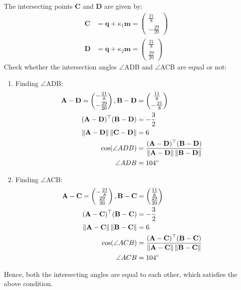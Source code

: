 \documentclass[12pt]{article}
\providecommand{\norm}[1]{\left\lVert#1\right\rVert}
\newcommand{\myvec}[1]{\ensuremath{\begin{pmatrix}#1\end{pmatrix}}}
\let\vec\mathbf
\let\vec\mathbf
\providecommand{\norm}[1]{\left\lVert#1\right\rVert}
\let\vec\mathbf
\begin{document}
The intersecting points $\vec{C}$ and $\vec{D}$ are given by:
\begin{align}
    \vec{C}&=\vec{q}+\kappa_1\vec{m}=\myvec{\frac{21}{8}\\[2pt]-\frac{29}{20}}\\
    \vec{D}&=\vec{q}+\kappa_2\vec{m}=\myvec{\frac{21}{8}\\[2pt]\frac{29}{20}}
\end{align}
Check whether the intersection angles $\angle$ADB and $\angle$ACB are equal or not:
\begin{enumerate}
\item Finding $\angle$ADB:
	\begin{align}
		 \vec{A-D} = \myvec{-\frac{21}{8}\\[2pt]-\frac{29}{20}},
		\vec{B-D}& = \myvec{\frac{11}{8}\\[2pt]-\frac{21}{8}}\\
	 \vec{(A-D)^\top(B-D)}&= -\frac{3}{2}\\
	 \norm{\vec{A-D}}\norm{\vec{C-D}}& = 6\\
		\cos(\angle ADB)& = \frac{\vec{(A-D)^\top(B-D)}}{\norm{\vec{A-D}}\norm{\vec{B-D}}}\\
		\angle ADB&=104\degree
\end{align}
\item Finding $\angle$ACB:
\begin{align}
	\vec{A-C} = \myvec{-\frac{21}{8}\\\frac{29}{20}},
	 \vec{B-C}& = \myvec{\frac{11}{8}\\\frac{29}{20}}\\
	 \vec{(A-C)^\top(B-C)}&= -\frac{3}{2}\\
	 \norm{\vec{A-C}}\norm{\vec{B-C}}& = 6\\
	 \cos(\angle ACB) &= \frac{\vec{(A-C)^\top(B-C)}}{\norm{\vec{A-C}}\norm{\vec{B-C}}}\\
	 \angle ACB&=104\degree
\end{align}
\end{enumerate}
Hence, both the intersecting angles are equal to each other, which satisfies the above condition.
\end{document}
